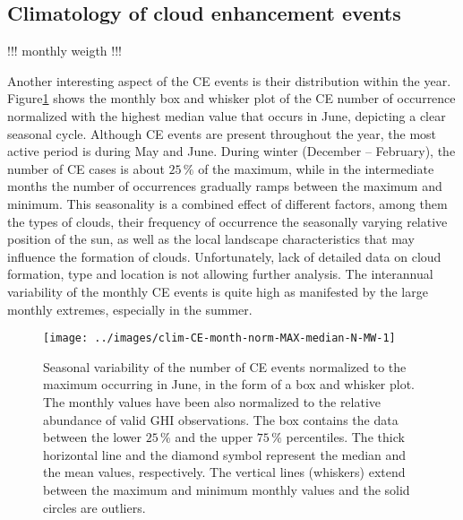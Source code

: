 \documentclass[preprint, 5p,
authoryear]{elsarticle} %
\begin{document}
\hypertarget{climatology-of-cloud-enhancement-events}{%
\subsection{Climatology of cloud enhancement
events}\label{climatology-of-cloud-enhancement-events}}

!!! monthly weigth !!!

Another interesting aspect of the CE events is their distribution within
the year. Figure\nobreakspace{}\ref{fig:relative-month-occurrences}
shows the monthly box and whisker plot of the CE number of occurrence
normalized with the highest median value that occurs in June, depicting
a clear seasonal cycle. Although CE events are present throughout the
year, the most active period is during May and June. During winter
(December -- February), the number of CE cases is about \(25\,\%\) of
the maximum, while in the intermediate months the number of occurrences
gradually ramps between the maximum and minimum. This seasonality is a
combined effect of different factors, among them the types of clouds,
their frequency of occurrence the seasonally varying relative position
of the sun, as well as the local landscape characteristics that may
influence the formation of clouds. Unfortunately, lack of detailed data
on cloud formation, type and location is not allowing further analysis.
The interannual variability of the monthly CE events is quite high as
manifested by the large monthly extremes, especially in the summer.

\begin{figure}

{\centering \texttt{[image: ../images/clim-CE-month-norm-MAX-median-N-MW-1]} 

}

\caption{Seasonal variability of the number of CE events normalized to the maximum occurring in June, in the form of a box and whisker plot. The monthly values have been also normalized to the relative abundance of valid GHI observations. The box contains the data between the lower $25\,\%$ and the upper $75\,\%$ percentiles. The thick horizontal line and the diamond symbol represent the median and the mean values, respectively. The vertical lines (whiskers) extend between the maximum and minimum monthly values and the solid circles are outliers.}\label{fig:relative-month-occurrences}
\end{figure}
\end{document}
